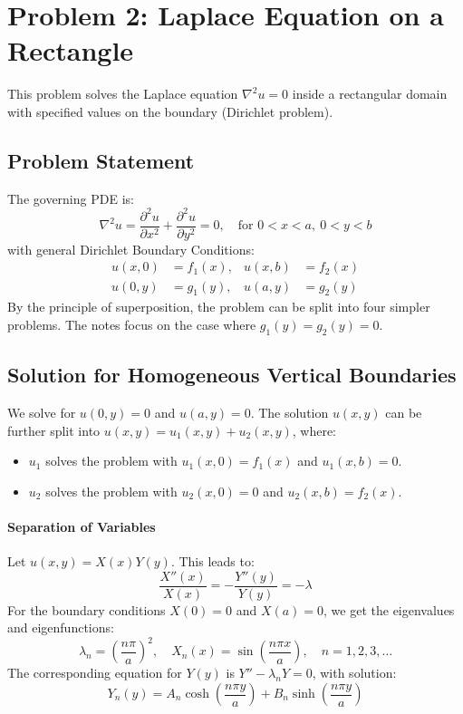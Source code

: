 \documentclass{article}
\begin{document}
	\pagebreak
	
	\section*{Problem 2: Laplace Equation on a Rectangle}
	This problem solves the Laplace equation $\nabla^2 u = 0$ inside a rectangular domain with specified values on the boundary (Dirichlet problem).
	
	\subsection*{Problem Statement}
	The governing PDE is:
	$$
	\nabla^2 u = \frac{\partial^2 u}{\partial x^2} + \frac{\partial^2 u}{\partial y^2} = 0, \quad \text{for } 0 < x < a, \ 0 < y < b
	$$
	with general Dirichlet Boundary Conditions:
	\begin{align*}
		u(x,0) &= f_1(x), & u(x,b) &= f_2(x) \\
		u(0,y) &= g_1(y), & u(a,y) &= g_2(y)
	\end{align*}
	By the principle of superposition, the problem can be split into four simpler problems. The notes focus on the case where $g_1(y)=g_2(y)=0$.
	
	\subsection*{Solution for Homogeneous Vertical Boundaries}
	We solve for $u(0,y)=0$ and $u(a,y)=0$. The solution $u(x,y)$ can be further split into $u(x,y) = u_1(x,y) + u_2(x,y)$, where:
	\begin{itemize}
		\item $u_1$ solves the problem with $u_1(x,0) = f_1(x)$ and $u_1(x,b) = 0$.
		\item $u_2$ solves the problem with $u_2(x,0) = 0$ and $u_2(x,b) = f_2(x)$.
	\end{itemize}
	
	\paragraph{Separation of Variables}
	Let $u(x,y) = X(x)Y(y)$. This leads to:
	$$
	\frac{X''(x)}{X(x)} = -\frac{Y''(y)}{Y(y)} = -\lambda
	$$
	For the boundary conditions $X(0)=0$ and $X(a)=0$, we get the eigenvalues and eigenfunctions:
	$$
	\lambda_n = \left(\frac{n\pi}{a}\right)^2, \quad X_n(x) = \sin\left(\frac{n\pi x}{a}\right), \quad n=1, 2, 3, \dots
	$$
	The corresponding equation for $Y(y)$ is $Y'' - \lambda_n Y = 0$, with solution:
	$$
	Y_n(y) = A_n \cosh\left(\frac{n\pi y}{a}\right) + B_n \sinh\left(\frac{n\pi y}{a}\right)
	$$
	
\end{document}
